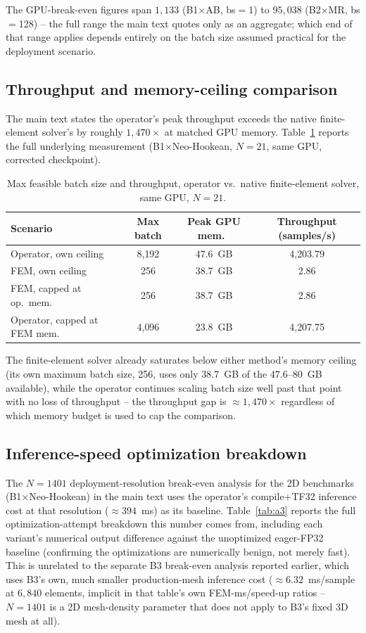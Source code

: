 \documentclass[final,5p,times]{elsarticle}
\begin{document}
The GPU-break-even figures span $1{,}133$ (B1$\times$AB, bs$=$1) to
$95{,}038$ (B2$\times$MR, bs$=$128) -- the full range the main text
quotes only as an aggregate; which end of that range applies depends
entirely on the batch size assumed practical for the deployment
scenario.

\subsection{Throughput and memory-ceiling comparison}
The main text states the operator's peak throughput exceeds
the native finite-element solver's by roughly $1{,}470\times$ at matched
GPU memory. Table~\ref{tab:a2} reports the full underlying measurement
(B1$\times$Neo-Hookean, $N{=}21$, same GPU, corrected checkpoint).

\begin{table}[ht]
\centering
\caption{Max feasible batch size and throughput, operator vs.\ native
  finite-element solver, same GPU, $N{=}21$.}
\label{tab:a2}
\small
\begin{tabular}{lccc}
\toprule
Scenario & Max batch & Peak GPU mem.\ & Throughput (samples/s) \\
\midrule
Operator, own ceiling         & 8{,}192 & 47.6~GB & 4{,}203.79 \\
FEM, own ceiling              & 256     & 38.7~GB & 2.86 \\
FEM, capped at op.\ mem.\     & 256     & 38.7~GB & 2.86 \\
Operator, capped at FEM mem.\ & 4{,}096 & 23.8~GB & 4{,}207.75 \\
\bottomrule
\end{tabular}
\end{table}

The finite-element solver already saturates below either method's memory
ceiling (its own maximum batch size, 256, uses only $38.7$~GB of the
$47.6$--$80$~GB available), while the operator continues scaling batch
size well past that point with no loss of throughput -- the throughput
gap is $\approx1{,}470\times$ regardless of which memory budget is used
to cap the comparison.

\subsection{Inference-speed optimization breakdown}
The $N{=}1401$ deployment-resolution break-even analysis for the 2D
benchmarks (B1$\times$Neo-Hookean) in the main text uses the operator's
compile+TF32 inference cost at that resolution ($\approx394$~ms) as its
baseline. Table~\ref{tab:a3} reports the full optimization-attempt
breakdown this number comes from, including each variant's numerical
output difference against the unoptimized eager-FP32 baseline
(confirming the optimizations are numerically benign, not merely fast).
This is unrelated to the separate B3 break-even analysis reported
earlier, which uses B3's own, much smaller production-mesh inference
cost ($\approx6.32$~ms/sample at $6{,}840$ elements, implicit in that table's
own FEM-ms/speed-up ratios -- $N{=}1401$ is a 2D mesh-density parameter
that does not apply to B3's fixed 3D mesh at all).
\end{document}
